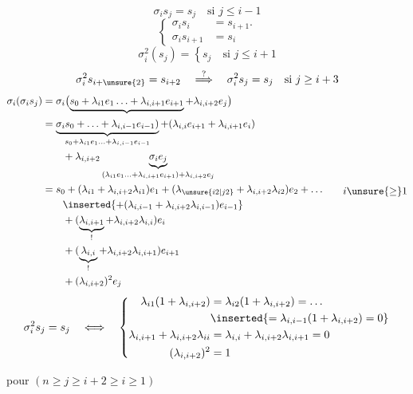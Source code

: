 \[
\boxed{\sigma_i s_j=s_j\quad\text{si }j\leq i-1}
\]
\[
\boxed{\left\{\begin{aligned}\sigma_i s_i&=s_{i+1}.\\\sigma_i s_{i+1}&=s_i\end{aligned}\right.}
\]
\[
\sigma_i^2(s_j)=\left\{s_j\quad\text{si }j\leq i+1\right.
\]
\[
\sigma_i^2s_{i+\unsure{2}}=s_{i+2}\quad\overset{?}{\Longrightarrow}\quad\sigma_i^2s_j=s_j\quad\text{si }j\geq i+3
\]
\[
\begin{aligned}
\sigma_i(\sigma_i s_j)&=\sigma_i\bigl(\underbrace{s_0+\lambda_{i1}e_1\ldots+\lambda_{i,i+1}e_{i+1}}+\lambda_{i,i+2}e_j\bigr)\\
&=\underbrace{\sigma_i s_0+\ldots+\lambda_{i,i-1}e_{i-1})}_{s_0+\lambda_{i1}e_1\ldots+\lambda_{i,i-1}e_{i-1}}+(\lambda_{i,i}e_{i+1}+\lambda_{i,i+1}e_i)\\
&\qquad+\lambda_{i,i+2}\underbrace{\sigma_i e_j}_{(\lambda_{i1}e_1\ldots+\lambda_{i,i+1}e_{i+1})+\lambda_{i,i+2}e_j}\\
&=s_0+(\lambda_{i1}+\lambda_{i,i+2}\lambda_{i1})e_1+(\lambda_{\unsure{i2|j2}}+\lambda_{i,i+2}\lambda_{i2})e_2+\ldots\\
&\qquad\inserted{+(\lambda_{i,i-1}+\lambda_{i,i+2}\lambda_{i,i-1})e_{i-1}}\\
&\qquad+(\underbrace{\lambda_{i,i+1}}_{!}+\lambda_{i,i+2}\lambda_{i,i})e_i\\
&\qquad+(\underbrace{\lambda_{i,i}}_{!}+\lambda_{i,i+2}\lambda_{i,i+1})e_{i+1}\\
&\qquad+(\lambda_{i,i+2})^2e_j
\end{aligned}
\qquad i\unsure{\geq}1
\]
\[
\begin{aligned}
\sigma_i^2s_j=s_j\quad\Longleftrightarrow\quad
\left\{\begin{aligned}
\lambda_{i1}(1+\lambda_{i,i+2})&=\lambda_{i2}(1+\lambda_{i,i+2})=\ldots\\
&\inserted{=\lambda_{i,i-1}(1+\lambda_{i,i+2})=0}\\
\lambda_{i,i+1}+\lambda_{i,i+2}\lambda_{ii}&=\lambda_{i,i}+\lambda_{i,i+2}\lambda_{i,i+1}=0\\
(\lambda_{i,i+2})^2&=1
\end{aligned}\right.
\end{aligned}
\]

pour $(n\geq j\geq i+2\geq i\geq1)$

